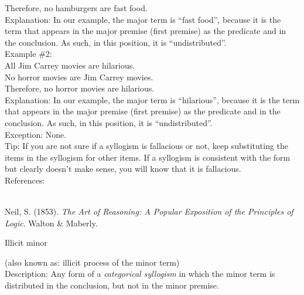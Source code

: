 \documentclass[a4paper,12pt,single,pdftex]{scrartcl}
\begin{document}
    
      Therefore, no hamburgers are fast food.
    \\

    
      Explanation: In our example, the major term is “fast food”, because it is the term that appears in the major premise (first premise) as the predicate and in the conclusion.  As such, in this position, it is “undistributed”.
    \\

    
      Example \#2:
    \\

    
      All Jim Carrey movies are hilarious.
    \\

    
      No horror movies are Jim Carrey movies.
    \\

    
      Therefore, no horror movies are hilarious.
    \\

    
      Explanation: In our example, the major term is “hilarious”, because it is the term that appears in the major premise (first premise) as the predicate and in the conclusion.  As such, in this position, it is “undistributed”.
    \\

    
      Exception: None.
    \\

    
      Tip: If you are not sure if a syllogism is fallacious or not, keep substituting the items in the syllogism for other items. If a syllogism is consistent with the form but clearly doesn’t make sense, you will know that it is fallacious.
    \\

    References:

    
      
        
      \\

      
        
          Neil, S. (1853). {\it The Art of Reasoning: A Popular Exposition of the Principles of Logic}. Walton \& Maberly.
        
      
    
  

Illicit minor
    
      (also known as: illicit process of the minor term)
    \\

  
    Description: Any form of a {\it categorical syllogism} in which the minor term is distributed in the conclusion, but not in the minor premise.
\end{document}
